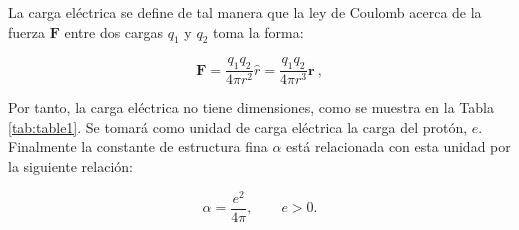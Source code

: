 La carga el\'{e}ctrica se define de tal manera que la ley de Coulomb acerca
de la fuerza $\mathbf{F}$ entre dos cargas $q_{1}$ y $q_{2}$ toma la forma:

\begin{equation}
\mathbf{F}=\frac{q_{1}q_{2}}{4\pi r^{2}}\hat{r}=\frac{q_{1}q_{2}}{4\pi r^{3}}%
\mathbf{r~,}  \label{41}
\end{equation}

Por tanto, la carga el\'{e}ctrica no tiene dimensiones, como se muestra en
la Tabla \ref{tab:table1}. Se tomar\'{a} como unidad de carga el\'{e}ctrica la
carga del prot\'{o}n, $e$. Finalmente la constante de estructura fina $%
\alpha $ est\'{a} relacionada con esta unidad por la siguiente relaci\'{o}n:

\begin{equation}
\alpha =\frac{e^{2}}{4\pi },\qquad e>0\text{.}  \label{42}
\end{equation}

